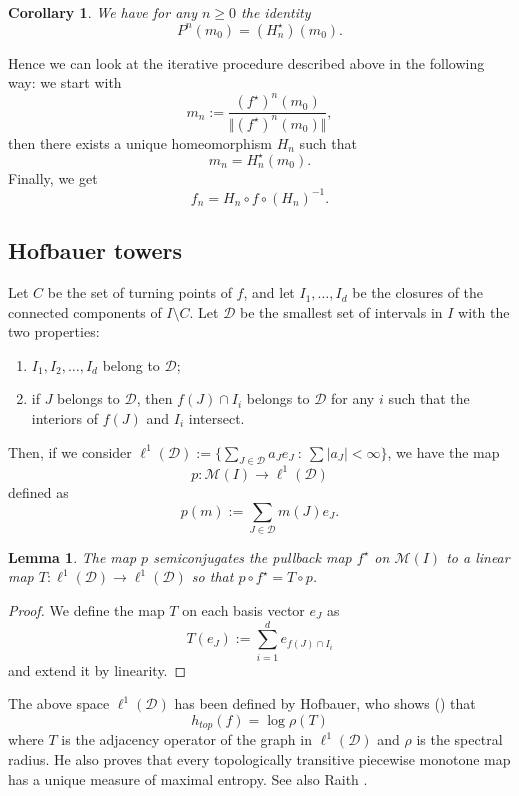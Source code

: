 \documentclass[11pt]{amsart}
\newtheorem{corollary}[theorem]{Corollary}
\newtheorem{lemma}[theorem]{Lemma}
\begin{document}
\begin{corollary} 
We have for any $n \geq 0$ the identity
$$P^{n}(m_0) = (H_n^\star)(m_0).$$
\end{corollary}

Hence we can look at the iterative procedure described above in the following way: 
we start with 
$$m_{n} := \frac{ (f^\star)^n(m_0) }{\Vert (f^\star)^n(m_0) \Vert},$$
then there exists a unique homeomorphism $H_{n}$ such that 
$$m_{n} = H_{n}^\star(m_0).$$
Finally, we get 
$$f_{n} = H_{n} \circ f \circ (H_{n})^{-1}.$$

\subsection{Hofbauer towers} 

Let $C$ be the set of turning points of $f$, and let $I_1, \dots, I_d$ be the closures of the connected components of $I \setminus C$. 
Let $\mathcal{D}$ be the smallest set of intervals in $I$ with the two properties: 
\begin{enumerate}
\item $I_1, I_2, \dots, I_d$ belong to $\mathcal{D}$; 

\item if $J$ belongs to $\mathcal{D}$, then $f(J) \cap I_i$ belongs to $\mathcal{D}$ 
for any $i$ such that the interiors of $f(J) $ and $I_i$ intersect. 

\end{enumerate}
Then, if we consider $\ell^1(\mathcal{D}) := \{ \sum_{J \in \mathcal{D}} a_J e_J \ : \ \sum |a_J| < \infty \}$,  we have the map 
$$p : \mathcal{M}(I) \to \ell^1(\mathcal{D})$$
defined as 
$$p(m) := \sum_{J \in \mathcal{D}} m(J) e_J.$$

\begin{lemma}
The map $p$ semiconjugates the pullback map $f^\star$ on $\mathcal{M}(I)$ to a linear map 
$T: \ell^1(\mathcal{D}) \to \ell^1(\mathcal{D})$
so that $p \circ f^\star = T \circ p$.
\end{lemma}

\begin{proof}
We define the map $T$ on each basis vector $e_J$ as 
$$T(e_J) := \sum_{i=1}^d e_{f(J) \cap I_i}$$
and extend it by linearity.
\end{proof}

The above space $\ell^1(\mathcal{D})$ has been defined by Hofbauer, 
who shows (\cite[Theorem 4]{Ho}) that 
$$h_{top}(f) = \log \rho(T)$$
where $T$ is the adjacency operator of the graph in $\ell^1(\mathcal{D})$ and $\rho$ is the spectral radius. 
He also proves that every topologically transitive piecewise monotone map has a unique measure of maximal entropy.
See also Raith \cite{Ra}.
\end{document}
